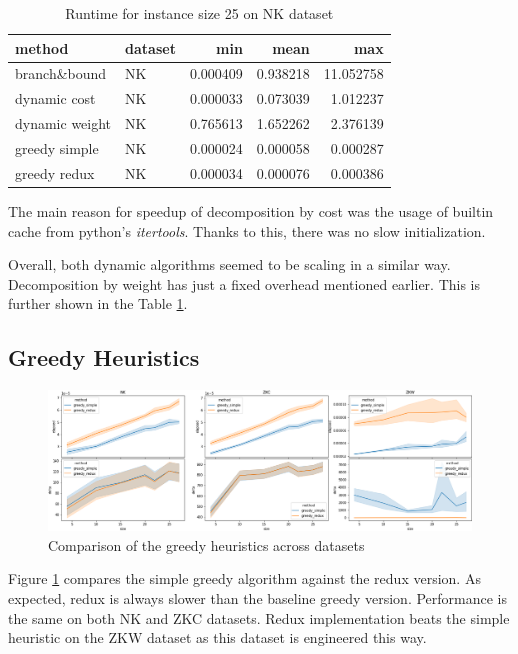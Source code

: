 \documentclass[a4paper,10pt]{article}
\begin{document}
\begin{table}[!htb]
\centering
\begin{tabular}{llrrr}
\toprule
method & dataset &       min &      mean &        max \\
\midrule
branch\&bound & NK &  0.000409 &  0.938218 &  11.052758 \\
dynamic cost & NK &  0.000033 &  0.073039 &   1.012237 \\
dynamic weight & NK &  0.765613 &  1.652262 &   2.376139 \\
greedy simple & NK &  0.000024 &  0.000058 &   0.000287 \\
greedy redux & NK &  0.000034 &  0.000076 &   0.000386 \\
\bottomrule
\end{tabular}
\caption{Runtime for instance size 25 on NK dataset}
\label{exacts_table}
\end{table}

The main reason for speedup of decomposition by cost was the usage of builtin cache from python's \emph{itertools}. Thanks to this, there was no slow initialization.

Overall, both dynamic algorithms seemed to be scaling in a similar way.  Decomposition by weight has just a fixed overhead mentioned earlier. This is further shown in the Table \ref{exacts_table}.

\subsection{Greedy Heuristics}

\begin{figure}[!htb]
	\centering
  	\includegraphics[width=\textwidth]{images/greedy_comparison_datasets.png}
	\caption{Comparison of the greedy heuristics across datasets}
	\label{greedy_comparison_datasets}
\end{figure}

Figure \ref{greedy_comparison_datasets} compares the simple greedy algorithm against the redux version. As expected, redux is always slower than the baseline greedy version. Performance is the same on both NK and ZKC datasets. Redux implementation beats the simple heuristic on the ZKW dataset as this dataset is engineered this way.
\end{document}
